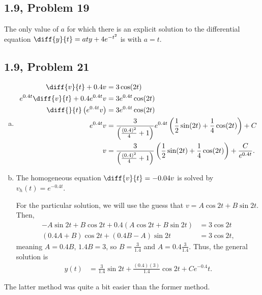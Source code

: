 \documentclass[10pt]{mypackage}
\begin{document}
\subsection{1.9, Problem 19}%
The only value of $a$ for which there is an explicit solution to the differential equation $\diff{y}{t} = aty + 4e^{-t^2}$ is with $a = t$.
\subsection{1.9, Problem 21}%
\begin{enumerate}[(a)]
  \item 
    \begin{align*}
      \diff{v}{t} + 0.4v &= 3\cos(2t)\\
      e^{0.4t}\diff{v}{t} + 0.4e^{0.4t}v &= 3e^{0.4t}\cos(2t)\\
      \diff{}{t}\left(e^{0.4t}v\right) &= 3e^{0.4t}\cos(2t)\\
      e^{0.4t}v &= \frac{3}{\left(\frac{\left(0.4\right)^2}{4}+1\right)}e^{0.4t}\left(\frac{1}{2}\sin(2t) + \frac{1}{4}\cos(2t)\right) + C\\
      v &= \frac{3}{\left(\frac{\left(0.4\right)^2}{4}+1\right)}\left(\frac{1}{2}\sin(2t) + \frac{1}{4}\cos(2t)\right) + \frac{C}{e^{0.4t}}.
    \end{align*}
  \item The homogeneous equation $\diff{v}{t} = -0.04v$ is solved by $v_h(t) = e^{-0.4t}$.\newline

    For the particular solution, we will use the guess that $v = A\cos 2t + B\sin 2t$. Then,
    \begin{align*}
      -A\sin 2t + B\cos 2t + 0.4\left(A\cos 2t + B\sin 2t\right) &= 3\cos 2t\\
      \left(0.4A + B\right)\cos 2t + \left(0.4B - A\right)\sin 2t &= 3\cos 2t,
    \end{align*}
    meaning $A = 0.4 B$, $1.4B = 3$, so $B = \frac{3}{1.4}$ and $A = 0.4\frac{3}{1.4}$. Thus, the general solution is
    \begin{align*}
      y(t) &= \frac{3}{1.4}\sin 2t + \frac{(0.4)(3)}{1.4}\cos 2t + C e^{-0.4}t.
    \end{align*}
\end{enumerate}
The latter method was quite a bit easier than the former method.
\end{document}
